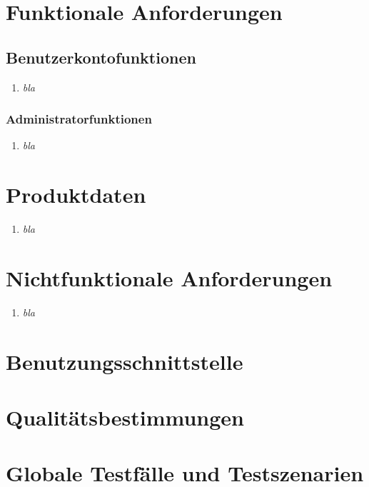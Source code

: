 \documentclass[parskip=full,11pt]{scrartcl}
\def\threedigits#1{%
  \ifnum#1<100 0\fi
  \ifnum#1<10 0\fi
  \number#1}
\begin{document}
\section{Funktionale Anforderungen}
\subsection{Benutzerkontofunktionen}
\begin{enumerate}[label={\textbf{/F\protect\threedigits{\theenumi}}}, leftmargin=*]
\item \textit{bla}
\end{enumerate}

\subsubsection{Administratorfunktionen}
\begin{enumerate}[label={\textbf{/F\protect\threedigits{\theenumi}}}, leftmargin=*]
\item \textit{bla}
\end{enumerate}

\section{Produktdaten}
\begin{enumerate}[label={\textbf{/D\protect\threedigits{\theenumi}}}, leftmargin=*]
\item \textit{bla}
\end{enumerate}
\section{Nichtfunktionale Anforderungen}
\begin{enumerate}[label={\textbf{/NF\protect\threedigits{\theenumi}}}, leftmargin=*]
\item \textit{bla}
\end{enumerate}



\section{Benutzungsschnittstelle}

\section{Qualitätsbestimmungen}

\section{Globale Testfälle und Testszenarien}

\newpage
\printglossary	
\end{document}

